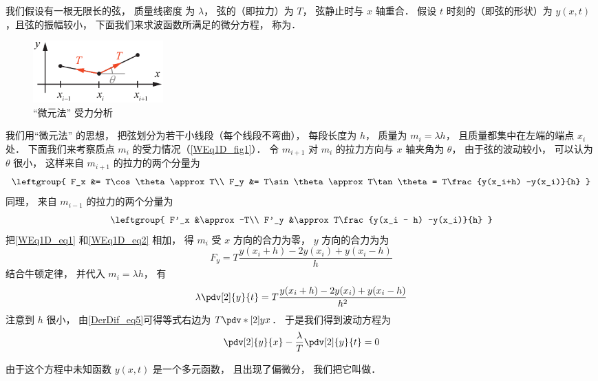 

我们假设有一根无限长的弦， 质量线密度%
为 $\lambda$， 弦的（即拉力）为 $T$， 弦静止时与 $x$ 轴重合． 假设 $t$ 时刻的（即弦的形状）为 $y(x, t)$，且弦的振幅较小， 下面我们来求波函数所满足的微分方程， 称为．

\begin{figure}[ht]
\centering
\includegraphics[width=5cm]{./figures/WEq1D1.pdf}
\caption{“微元法” 受力分析} \label{WEq1D_fig1}
\end{figure}

我们用“微元法” 的思想， 把弦划分为若干小线段（每个线段不弯曲）， 每段长度为 $h$， 质量为 $m_i = \lambda h$， 且质量都集中在左端的端点 $x_i$ 处． 下面我们来考察质点 $m_i$ 的受力情况（\autoref{WEq1D_fig1}）． 令 $m_{i+1}$ 对 $m_i$ 的拉力方向与 $x$ 轴夹角为 $\theta$， 由于弦的波动较小， 可以认为 $\theta$ 很小， 这样来自 $m_{i+1}$ 的拉力的两个分量为
\begin{equation}\label{WEq1D_eq1}
\leftgroup{
F_x &= T\cos\theta \approx T\\
F_y &= T\sin\theta \approx T\tan\theta = T\frac{y(x_i+h) -y(x_i)}{h}
}\end{equation}
同理， 来自 $m_{i-1}$ 的拉力的两个分量为
\begin{equation}\label{WEq1D_eq2}
\leftgroup{
F'_x &\approx -T\\
F'_y &\approx T\frac{y(x_i - h) -y(x_i)}{h}
}\end{equation}
把\autoref{WEq1D_eq1} 和\autoref{WEq1D_eq2} 相加， 得 $m_i$ 受 $x$ 方向的合力为零， $y$ 方向的合力为为
\begin{equation}
F_y = T\frac{y(x_i+h) - 2y(x_i) + y(x_i-h)}{h}
\end{equation}
结合牛顿定律， 并代入 $m_i = \lambda h$， 有
\begin{equation}
\lambda \pdv[2]{y}{t} = T\frac{y(x_i+h) - 2y(x_i) + y(x_i-h)}{h^2}
\end{equation}
注意到 $h$ 很小， 由\autoref{DerDif_eq5}可得等式右边为 $T\pdv*[2]{y}{x}$． 于是我们得到波动方程为
\begin{equation}
\pdv[2]{y}{x} - \frac{\lambda}{T}\pdv[2]{y}{t} = 0
\end{equation}

由于这个方程中未知函数 $y(x,t)$ 是一个多元函数， 且出现了偏微分， 我们把它叫做．


